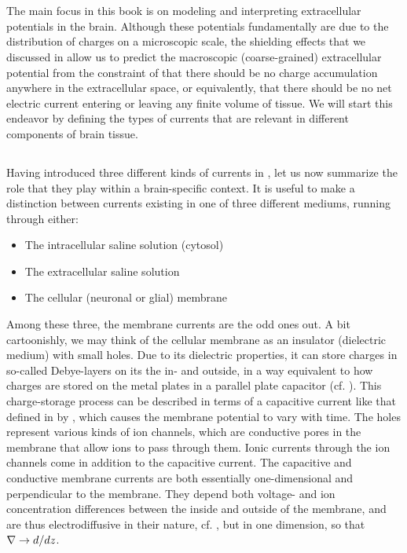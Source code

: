 \section{}
\label{sec:Basics:ECSpot}
The main focus in this book is on modeling and interpreting extracellular potentials in the brain. Although these potentials fundamentally are due to the distribution of charges on a microscopic scale, the shielding effects that we discussed in   allow us to predict the macroscopic (coarse-grained) extracellular potential from the constraint of that there should be no charge accumulation anywhere in the extracellular space, or equivalently, that there should be no net electric current entering or leaving any finite volume of tissue. We will start this endeavor by defining the types of currents that are relevant in different components of brain tissue. 

\subsection{}
\label{Basics:braincurrents}
Having introduced three different kinds of currents in , let us now summarize the role that they play within a brain-specific context. It is useful to make a distinction between currents existing in one of three different mediums, running through either: 
\begin{itemize}
\item The intracellular saline solution (cytosol)
\item The extracellular saline solution
\item The cellular (neuronal or glial) membrane
\end{itemize}

Among these three, the membrane currents are the odd ones out. A bit cartoonishly, we may think of the cellular membrane as an insulator (dielectric medium) with small holes. Due to its dielectric properties, it can store charges in so-called Debye-layers on its the in- and outside, in a way equivalent to how charges are stored on the metal plates in a parallel plate capacitor (cf. ). This charge-storage process can be described in terms of a capacitive current like that defined in by , which causes the membrane potential to vary with time. The holes represent various kinds of ion channels, which are conductive pores in the membrane that allow ions to pass through them. Ionic currents through the ion channels come in addition to the capacitive current. The capacitive and conductive membrane currents are both essentially one-dimensional and perpendicular to the membrane. They depend both voltage- and ion concentration differences between the inside and outside of the membrane, and are thus electrodiffusive in their nature, cf. , but in one dimension, so that ${\bf \nabla} \rightarrow d/dz$. 


